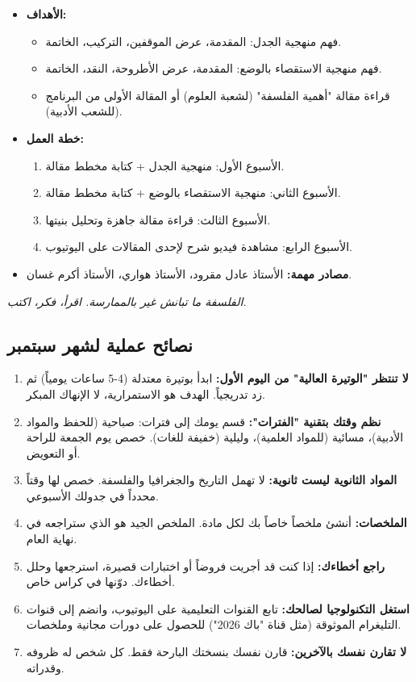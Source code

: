 \documentclass[12pt,a4paper]{book}
\newcommand{\quoteAr}[1]{%
	\begin{myquote}
		\itshape #1
	\end{myquote}
}
\begin{document}
	\begin{itemize}
		\item \textbf{الأهداف:}
		\begin{itemize}
			\item فهم منهجية الجدل: المقدمة، عرض الموقفين، التركيب، الخاتمة.
			\item فهم منهجية الاستقصاء بالوضع: المقدمة، عرض الأطروحة، النقد، الخاتمة.
			\item قراءة مقالة "أهمية الفلسفة" (لشعبة العلوم) أو المقالة الأولى من البرنامج (للشعب الأدبية).
		\end{itemize}
		\item \textbf{خطة العمل:}
		\begin{enumerate}
			\item الأسبوع الأول: منهجية الجدل + كتابة مخطط مقالة.
			\item الأسبوع الثاني: منهجية الاستقصاء بالوضع + كتابة مخطط مقالة.
			\item الأسبوع الثالث: قراءة مقالة جاهزة وتحليل بنيتها.
			\item الأسبوع الرابع: مشاهدة فيديو شرح لإحدى المقالات على اليوتيوب.
		\end{enumerate}
		\item \textbf{مصادر مهمة:} الأستاذ عادل مقرود، الأستاذ هواري، الأستاذ أكرم غسان.
	\end{itemize}
	
	\quoteAr{الفلسفة ما تبانش غير بالممارسة. اقرأ، فكر، اكتب.}
	
	\subsection{نصائح عملية لشهر سبتمبر}
	\label{sec:random-tips1}
	
	\begin{enumerate}
		\item \textbf{لا تنتظر "الوتيرة العالية" من اليوم الأول:} ابدأ بوتيرة معتدلة (4-5 ساعات يومياً) ثم زد تدريجياً. الهدف هو الاستمرارية، لا الإنهاك المبكر.
		\item \textbf{نظم وقتك بتقنية "الفترات":} قسم يومك إلى فترات: صباحية (للحفظ والمواد الأدبية)، مسائية (للمواد العلمية)، وليلية (خفيفة للغات). خصص يوم الجمعة للراحة أو التعويض.
		\item \textbf{المواد الثانوية ليست ثانوية:} لا تهمل التاريخ والجغرافيا والفلسفة. خصص لها وقتاً محدداً في جدولك الأسبوعي.
		\item \textbf{الملخصات:} أنشئ ملخصاً خاصاً بك لكل مادة. الملخص الجيد هو الذي ستراجعه في نهاية العام.
		\item \textbf{راجع أخطاءك:} إذا كنت قد أجريت فروضاً أو اختبارات قصيرة، استرجعها وحلل أخطاءك. دوّنها في كراس خاص.
		\item \textbf{استغل التكنولوجيا لصالحك:} تابع القنوات التعليمية على اليوتيوب، وانضم إلى قنوات التليغرام الموثوقة (مثل قناة "باك 2026") للحصول على دورات مجانية وملخصات.
		\item \textbf{لا تقارن نفسك بالآخرين:} قارن نفسك بنسختك البارحة فقط. كل شخص له ظروفه وقدراته.
	\end{enumerate}
	
\end{document}
